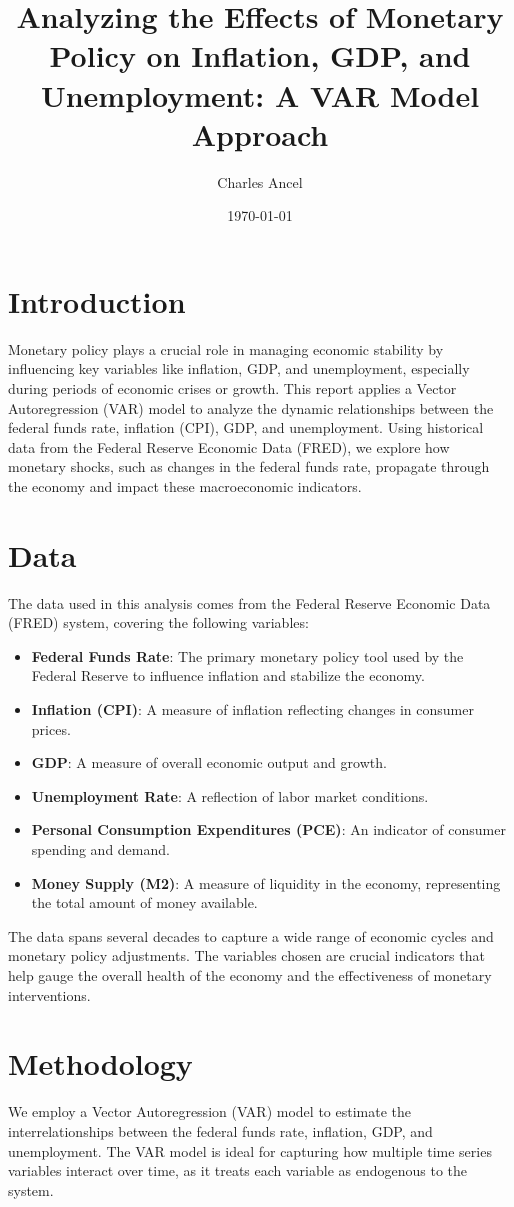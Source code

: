 \documentclass{article}
\title{Analyzing the Effects of Monetary Policy on Inflation, GDP, and Unemployment: A VAR Model Approach}
\author{Charles Ancel}
\date{\today}
\begin{document}
\maketitle

\section{Introduction}
Monetary policy plays a crucial role in managing economic stability by influencing key variables like inflation, GDP, and unemployment, especially during periods of economic crises or growth. This report applies a Vector Autoregression (VAR) model to analyze the dynamic relationships between the federal funds rate, inflation (CPI), GDP, and unemployment. Using historical data from the Federal Reserve Economic Data (FRED), we explore how monetary shocks, such as changes in the federal funds rate, propagate through the economy and impact these macroeconomic indicators.

\section{Data}
The data used in this analysis comes from the Federal Reserve Economic Data (FRED) system, covering the following variables:
\begin{itemize}
    \item \textbf{Federal Funds Rate}: The primary monetary policy tool used by the Federal Reserve to influence inflation and stabilize the economy.
    \item \textbf{Inflation (CPI)}: A measure of inflation reflecting changes in consumer prices.
    \item \textbf{GDP}: A measure of overall economic output and growth.
    \item \textbf{Unemployment Rate}: A reflection of labor market conditions.
    \item \textbf{Personal Consumption Expenditures (PCE)}: An indicator of consumer spending and demand.
    \item \textbf{Money Supply (M2)}: A measure of liquidity in the economy, representing the total amount of money available.
\end{itemize}
The data spans several decades to capture a wide range of economic cycles and monetary policy adjustments. The variables chosen are crucial indicators that help gauge the overall health of the economy and the effectiveness of monetary interventions.

\section{Methodology}
We employ a Vector Autoregression (VAR) model to estimate the interrelationships between the federal funds rate, inflation, GDP, and unemployment. The VAR model is ideal for capturing how multiple time series variables interact over time, as it treats each variable as endogenous to the system.
\end{document}
